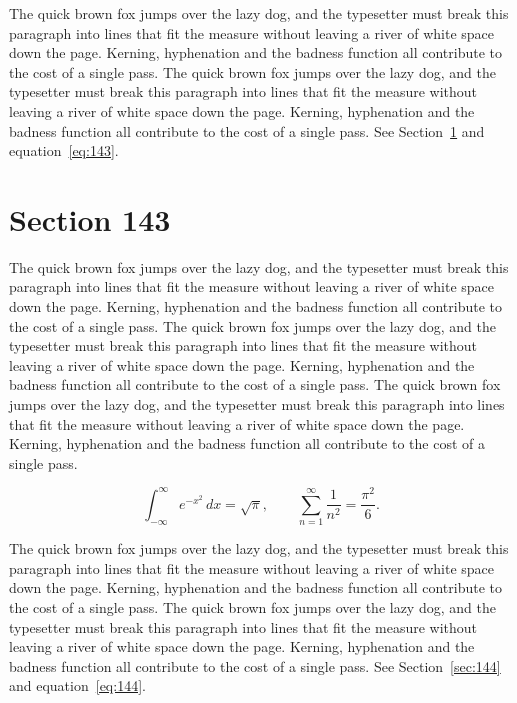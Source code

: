 \documentclass{article}
\begin{document}
The quick brown fox jumps over the lazy dog, and the typesetter must break this paragraph into lines that fit the measure without leaving a river of white space down the page. Kerning, hyphenation and the badness function all contribute to the cost of a single pass. The quick brown fox jumps over the lazy dog, and the typesetter must break this paragraph into lines that fit the measure without leaving a river of white space down the page. Kerning, hyphenation and the badness function all contribute to the cost of a single pass. 
See Section~\ref{sec:143} and equation~\eqref{eq:143}.
\section{Section 143}
\label{sec:143}
The quick brown fox jumps over the lazy dog, and the typesetter must break this paragraph into lines that fit the measure without leaving a river of white space down the page. Kerning, hyphenation and the badness function all contribute to the cost of a single pass. The quick brown fox jumps over the lazy dog, and the typesetter must break this paragraph into lines that fit the measure without leaving a river of white space down the page. Kerning, hyphenation and the badness function all contribute to the cost of a single pass. The quick brown fox jumps over the lazy dog, and the typesetter must break this paragraph into lines that fit the measure without leaving a river of white space down the page. Kerning, hyphenation and the badness function all contribute to the cost of a single pass. 

\begin{equation}\label{eq:143}
\int_{-\infty}^{\infty} e^{-x^{2}}\,dx = \sqrt{\pi}, \qquad
\sum_{n=1}^{\infty} \frac{1}{n^{2}} = \frac{\pi^{2}}{6}.
\end{equation}

The quick brown fox jumps over the lazy dog, and the typesetter must break this paragraph into lines that fit the measure without leaving a river of white space down the page. Kerning, hyphenation and the badness function all contribute to the cost of a single pass. The quick brown fox jumps over the lazy dog, and the typesetter must break this paragraph into lines that fit the measure without leaving a river of white space down the page. Kerning, hyphenation and the badness function all contribute to the cost of a single pass. 
See Section~\ref{sec:144} and equation~\eqref{eq:144}.
\end{document}
